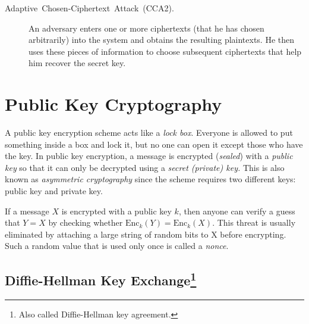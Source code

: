 \documentclass[11pt]{article}
\theoremstyle{plain}
\begin{document}
\begin{description}
	\item [{Adaptive~Chosen-Ciphertext~Attack~(CCA2).}] An adversary enters
	one or more ciphertexts (that he has chosen arbitrarily) into the
	system and obtains the resulting plaintexts. He then uses these pieces
	of information to choose subsequent ciphertexts that help him recover
	the secret key.
\end{description}

\section{Public Key Cryptography \label{sec:Public-Key-Cryptography}}

A public key encryption scheme acts like a \emph{lock box}. Everyone
is allowed to put something inside a box and lock it, but no one can
open it except those who have the key. In public key encryption, a
message is encrypted (\emph{sealed}) with a \emph{public key} so that
it can only be decrypted using a \emph{secret (private) key.} This
is also known as \emph{asymmetric cryptography} since the scheme requires
two different keys: public key and private key.

If a message $X$ is encrypted with a public key $k$, then anyone
can verify a guess that $Y=X$ by checking whether $\text{Enc}_{k}(Y)=\text{Enc}_{k}(X)$.
This threat is usually eliminated by attaching a large string of random
bits to X before encrypting. Such a random value that is used only
once is called a \emph{nonce}.

\subsection{Diffie-Hellman Key Exchange\protect\footnote{Also called Diffie-Hellman key agreement.}}
\end{document}
